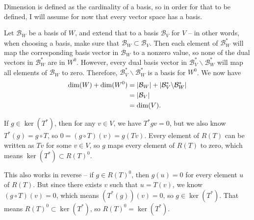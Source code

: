 \documentclass{article}
\begin{document}
\bigskip
\par
\begin{prob}
\end{prob}
Dimension is defined as the cardinality of a basis, so in order for that to be defined, I will assume for now that every vector space has a basis.
\par
Let $\mathcal{B}_W$ be a basis of $W$, and extend that to a basis $\mathcal{B}_V$ for $V$ -- in other words, when choosing a basis, make sure that $\mathcal{B}_W \subset \mathcal{B}_V$. Then each element of $\mathcal{B}_W^*$ will map the corresponding basis vector in $\mathcal{B}_W$ to a nonzero value, so none of the dual vectors in $\mathcal{B}_W^*$ are in $W^0$. However, every dual basis vector in $\mathcal{B}_V^* \backslash \mathcal{B}_W^*$ will map all elements of $\mathcal{B}_W$ to zero. Therefore, $\mathcal{B}_V^* \backslash \mathcal{B}_W^*$ is a basis for $W^0$. We now have
\begin{align*}
    \dim(W) + \dim(W^0) &= \left\lvert \mathcal{B}_W \right\rvert + \left\lvert \mathcal{B}_V^* \backslash \mathcal{B}_W^* \right\rvert \\
                        &= \left\lvert \mathcal{B}_V \right\rvert \\
                        &= \dim(V).
\end{align*}

\bigskip
\par
\begin{prob}
\end{prob}
If $g \in \ker(T^*)$, then for any $v \in V$, we have $T^*gv = 0$, but we also know $T^*(g) = g \circ T$, so $0 = (g \circ T)(v) = g(Tv)$. Every element of $R(T)$ can be written as $Tv$ for some $v \in V$, so $g$ maps every element of $R(T)$ to zero, which means $\ker(T^*) \subset R(T)^0$.
\par
This also works in reverse -- if $g \in R(T)^0$, then $g(u)=0$ for every element $u$ of $R(T)$. But since there exists $v$ such that $u=T(v)$, we know $(g \circ T)(v) = 0$, which means $(T^*(g))(v)=0$, so $g \in \ker(T^*)$. That means $R(T)^0 \subset \ker(T^*)$, so $R(T)^0 = \ker(T^*)$.
\end{document}

